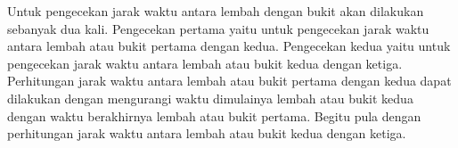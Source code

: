 Untuk pengecekan jarak waktu antara lembah dengan bukit akan dilakukan sebanyak dua kali. Pengecekan pertama yaitu untuk pengecekan jarak waktu antara lembah atau bukit pertama dengan kedua. Pengecekan kedua yaitu untuk pengecekan jarak waktu antara lembah atau bukit kedua dengan ketiga. Perhitungan jarak waktu antara lembah atau bukit pertama dengan kedua dapat dilakukan dengan mengurangi waktu dimulainya lembah atau bukit kedua dengan waktu berakhirnya lembah atau bukit pertama. Begitu pula dengan perhitungan jarak waktu antara lembah atau bukit kedua dengan ketiga.